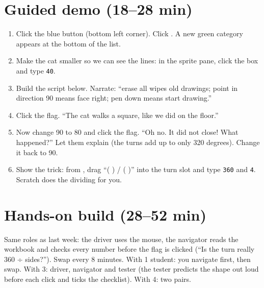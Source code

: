 \section{Guided demo (18--28 min)}
\begin{workedexample}
\par\noindent\begin{minipage}[t]{0.56\linewidth}
\begin{enumerate}[leftmargin=1.4em,itemsep=1pt]
  \item Click the blue  button (bottom left corner). Click . A new green  category appears at the bottom of the list.
  \item Make the cat smaller so we can see the lines: in the sprite pane, click the  box and type \texttt{40}.
  \item Build the script below. Narrate: \enquote{erase all wipes old drawings; point in direction 90 means face right; pen down means start drawing.}
  \item Click the flag. \enquote{The cat walks a square, like we did on the floor.}
  \item Now change 90 to 80 and click the flag. \enquote{Oh no. It did not close! What happened?} Let them explain (the turns add up to only 320 degrees). Change it back to 90.
  \item Show the trick: from , drag \enquote{( ) / ( )} into the turn slot and type \texttt{360} and \texttt{4}. Scratch does the dividing for you.
\end{enumerate}
\end{minipage}\hfill
\begin{minipage}[t]{0.40\linewidth}\vspace{4pt}\centering
\begin{scratch}[scale=0.78]
\end{scratch}
\end{minipage}

\end{workedexample}

\section{Hands-on build (28--52 min)}
\begin{pairroles}
Same roles as last week: the driver uses the mouse, the navigator reads the workbook and checks every number before the flag is clicked (\enquote{Is the turn really 360 ÷ sides?}). Swap every 8 minutes. With 1 student: you navigate first, then swap. With 3: driver, navigator and tester (the tester predicts the shape out loud before each click and ticks the checklist). With 4: two pairs.
\end{pairroles}

